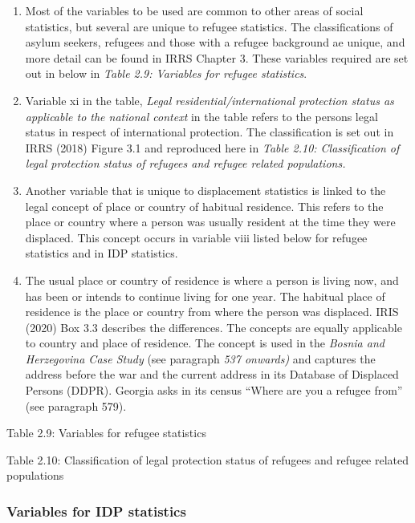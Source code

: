 \documentclass[
]{article}
\begin{document}
\begin{enumerate}
\def\labelenumi{\arabic{enumi}.}
\setcounter{enumi}{74}
\item
  Most of the variables to be used are common to other areas of social
  statistics, but several are unique to refugee statistics. The
  classifications of asylum seekers, refugees and those with a refugee
  background ae unique, and more detail can be found in IRRS
  Chapter 3. These variables required are set out in below in \emph{Table
  2.9: Variables for refugee statistics}.
\item
  Variable xi in the table, \emph{Legal residential/international
  protection status as applicable to the national context} in the
  table refers to the persons legal status in respect of international
  protection. The classification is set out in IRRS (2018) Figure 3.1
  and reproduced here in \emph{Table 2.10: Classification of legal
  protection status of refugees and refugee related populations.}
\item
  Another variable that is unique to displacement statistics is linked
  to the legal concept of place or country of habitual residence. This
  refers to the place or country where a person was usually resident
  at the time they were displaced. This concept occurs in variable
  viii listed below for refugee statistics and in IDP statistics.
\item
  The usual place or country of residence is where a person is living
  now, and has been or intends to continue living for one year. The
  habitual place of residence is the place or country from where the
  person was displaced. IRIS (2020) Box 3.3 describes the differences.
  The concepts are equally applicable to country and place of
  residence. The concept is used in the \emph{Bosnia and Herzegovina Case
  Study} (see paragraph \emph{537 onwards)} and captures the address before
  the war and the current address in its Database of Displaced Persons
  (DDPR). Georgia asks in its census ``Where are you a refugee from''
  (see paragraph 579).
\end{enumerate}

Table 2.9: Variables for refugee statistics

Table 2.10: Classification of legal protection status of refugees and
refugee related populations

\hypertarget{variables-for-idp-statistics}{%
\subsubsection{Variables for IDP statistics}\label{variables-for-idp-statistics}}
\end{document}
